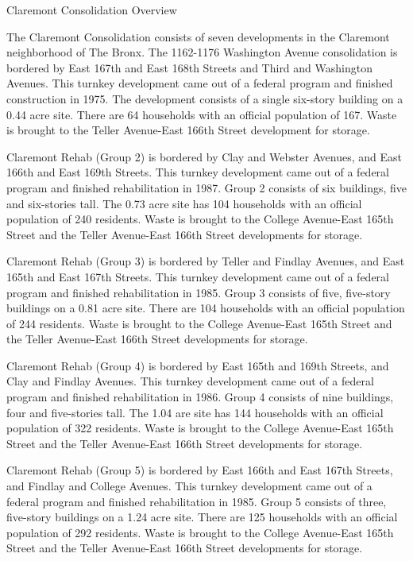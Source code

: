 Claremont Consolidation Overview

The Claremont Consolidation consists of seven developments in the Claremont neighborhood of The Bronx. The 1162-1176 Washington Avenue consolidation is bordered by East 167th and East 168th Streets and Third and Washington Avenues. This turnkey development came out of a federal program and finished construction in 1975. The development consists of a single six-story building on a 0.44 acre site. There are 64 households with an official population of 167. Waste is brought to the Teller Avenue-East 166th Street development for storage.

Claremont Rehab (Group 2) is bordered by Clay and Webster Avenues, and East 166th and East 169th Streets. This turnkey development came out of a federal program and finished rehabilitation in 1987. Group 2 consists of six buildings, five and six-stories tall. The 0.73 acre site has 104 households with an official population of 240 residents. Waste is brought to the College Avenue-East 165th Street and the Teller Avenue-East 166th Street developments for storage.

Claremont Rehab (Group 3) is bordered by Teller and Findlay Avenues, and East 165th and East 167th Streets. This turnkey development came out of a federal program and finished rehabilitation in 1985. Group 3 consists of five, five-story buildings on a 0.81 acre site. There are 104 households with an official population of 244 residents. Waste is brought to the College Avenue-East 165th Street and the Teller Avenue-East 166th Street developments for storage.

Claremont Rehab (Group 4) is bordered by East 165th and 169th Streets, and Clay and Findlay Avenues. This turnkey development came out of a federal program and finished rehabilitation in 1986. Group 4 consists of nine buildings, four and five-stories tall. The 1.04 are site has 144 households with an official population of 322 residents. Waste is brought to the College Avenue-East 165th Street and the Teller Avenue-East 166th Street developments for storage.

Claremont Rehab (Group 5) is bordered by East 166th and East 167th Streets, and Findlay and College Avenues. This turnkey development came out of a federal program and finished rehabilitation in 1985. Group 5 consists of three, five-story buildings on a 1.24 acre site. There are 125 households with an official population of 292 residents. Waste is brought to the College Avenue-East 165th Street and the Teller Avenue-East 166th Street developments for storage.

